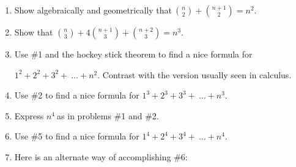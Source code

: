 \documentclass[10pt,letter]{article}
\begin{document}
\begin{enumerate}
\def\labelenumi{\arabic{enumi}.}

\item
  Show algebraically and geometrically that\(\
\binom{n}{2}
 +
\binom{n + 1}{2}
 = n^{2}\).
\item
  Show that \(\binom{n}{3}
 + 4
\binom{n + 1}{3}
 +
\binom{n + 2}{3}
 = n^{3}\).
\item
  Use \#1 and the hockey stick theorem to find a nice formula for

\(1^{2} + 2^{2} + 3^{2} + \ \ldots + n^{2}\). Contrast with the
  version usually seen in calculus.
\item
  Use \#2 to find a nice formula for
  \(1^{3} + 2^{3} + 3^{3} + \ \ldots + n^{3}\).
\item
  Express \(n^{4}\ \)as in problems \#1 and \#2.
\item
  Use \#5 to find a nice formula for
  \(1^{4} + 2^{4} + 3^{4} + \ \ldots + n^{4}\).
\item
  Here is an alternate way of accomplishing \#6:

\end{enumerate}
\end{document}
